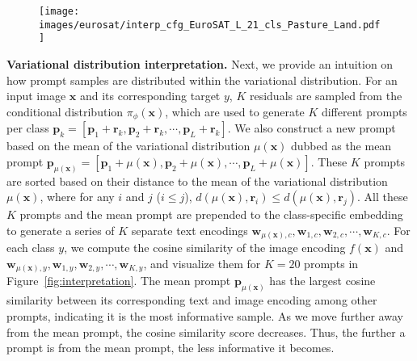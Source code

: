 \documentclass[10pt,twocolumn,letterpaper]{article}
\newcommand{\x}{\mathbf{x}}
\newcommand{\w}{\mathbf{w}}
\newcommand{\p}{\mathbf{p}}
\def\rvr{{\mathbf{r}}}
\def\rvr{{\mathbf{r}}}
\begin{document}
\begin{figure*}[t!]
\centering
\begin{subfigure}{0.96\linewidth}
  \centering
  \texttt{[image: images/eurosat/interp\_cfg\_EuroSAT\_L\_21\_cls\_Pasture\_Land.pdf]}
\end{subfigure}\vspace{-2mm}
\caption{\textbf{Variational distribution interpretation} on the EuroSAT dataset. The text encoding of the mean prompt $\p_{\mu(\x)}$ () is the most similar to the image encoding. As we move further away from the mean prompt, the cosine similarity scores between the text encoding and image encoding decrease further ().
When we ensemble the text encoding of different prompts the cosine similarity increases (), where the maximum similarity is obtained when all text encodings are combined. 
}
\vspace{-2mm}
\label{fig:interpretation}
\end{figure*}

\textbf{Variational distribution interpretation.} Next, we provide an intuition on how prompt samples are distributed within the variational distribution. For an input image $\x$ and its corresponding target $y$, $K$ residuals are sampled from the conditional distribution $\pi_\phi(\x)$, which are used to generate $K$ different prompts per class $\p_{k} {=} [\p_1 + \rvr_k, \p_2 + \rvr_k, \cdots, \p_L + \rvr_k]$. We also construct a new prompt based on the mean of the variational distribution $\mu(\x)$ dubbed as the mean prompt $\p_{\mu(\x)} {=} [\p_1 + \mu(\x), \p_2 + \mu(\x), \cdots, \p_L + \mu(\x)]$. These $K$ prompts are sorted based on their distance to the mean of the variational distribution $\mu(\x)$, where for any $i$ and $j$ ($i \leq j$), $d(\mu(\x),\rvr_i) \leq d(\mu(\x),\rvr_j)$. All these $K$ prompts and the mean prompt are prepended to the class-specific embedding to generate a series of $K$ separate text encodings $\w_{\mu(\x),c}, \w_{1,c}, \w_{2,c}, \cdots, \w_{K,c}$. For each class $y$, we compute the cosine similarity of the image encoding $f(\x)$ and $\w_{\mu(\x),y}, \w_{1,y}, \w_{2,y}, \cdots, \w_{K,y}$, and visualize them for $K{=}20$ prompts in Figure~\ref{fig:interpretation}. The mean prompt $\p_{\mu(\x)}$ has the largest cosine similarity between its corresponding text and image encoding among other prompts, indicating it is the most informative sample. As we move further away from the mean prompt, the cosine similarity score decreases. Thus, the further a prompt is from the mean prompt, the less informative it becomes. 
\end{document}
